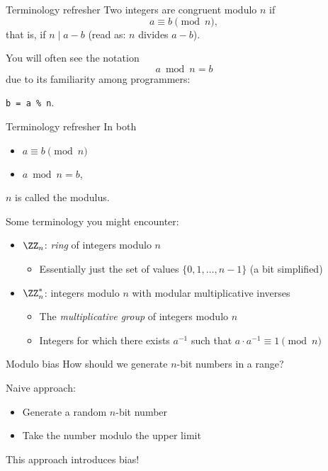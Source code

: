 \begin{frame}{Terminology refresher}
  Two integers are \alert{congruent} modulo $n$ if
  \[
    a \equiv b \pmod{n},
  \]
  \pause
  that is, if $n \mid a - b$ (read as: $n$ divides $a-b$).

  \vspace*{1em}

  \pause
  You will often see the notation
  \[
    a \bmod n = b
  \]
  due to its familiarity among programmers:
  \begin{center}
    \texttt{b = a \% n}.
  \end{center}
\end{frame}

\begin{frame}{Terminology refresher}
  In both
  \begin{itemize}
    \item $a \equiv b \pmod{n}$ 
    \item $a \bmod n = b$,
  \end{itemize}
  $n$ is called the \alert{modulus}.

  \pause
  Some terminology you might encounter:
  \begin{itemize}[<+(1)->]
    \item $\ZZ_n$: \emph{ring} of integers modulo $n$
    \begin{itemize}
      \item Essentially just the set of values $\{0, 1, \dots, n-1\}$ (a bit simplified)
    \end{itemize}
    \item $\ZZ_n^*$: integers modulo $n$ with modular multiplicative inverses
    \begin{itemize}
      \item The \emph{multiplicative group} of integers modulo $n$
      \item Integers for which there exists $a^{-1}$ such that $a\cdot a^{-1} \equiv 1 \pmod{n}$
    \end{itemize}
  \end{itemize}
\end{frame}

\begin{frame}{Modulo bias}
  How should we generate $n$-bit numbers in a range?

  \pause
  Naive approach:
  \begin{itemize}[<+(1)->]
    \item Generate a random $n$-bit number
    \item Take the number modulo the upper limit
  \end{itemize}

  \pause
  This approach introduces bias!
\end{frame}

